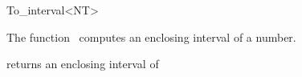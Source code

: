 \begin{ccRefFunctionObjectClass}{To_interval<NT>}

\ccDefinition

The function \ccRefName\ computes an enclosing interval of a number.


\ccIsModel
{}

{returns an enclosing interval of }

\end{ccRefFunctionObjectClass}
